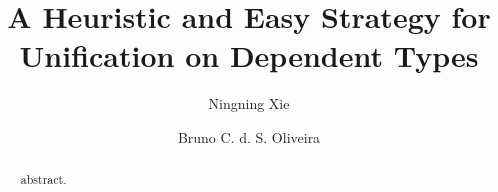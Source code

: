 \documentclass[preprint, nocopyrightspace]{llncs}
\author{Ningning Xie \and Bruno C. d. S. Oliveira}
\institute{The University of Hong Kong}
\begin{document}
\setlength{\pdfpageheight}{\paperheight}
\setlength{\pdfpagewidth}{\paperwidth}


\title{A Heuristic and Easy Strategy for Unification on Dependent Types}
\maketitle

\begin{abstract}
  abstract.
\end{abstract}










\appendix

\end{document}
